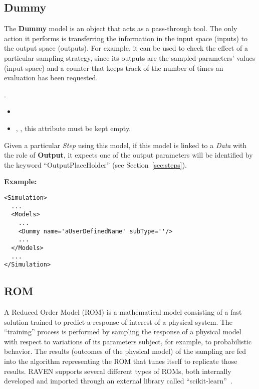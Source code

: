 \subsection{Dummy}
\label{subsec:models_dummy}
The \textbf{Dummy} model is an object that acts as a pass-through tool.
%
The only action it performs is transferring the information in the input
space (inputs) to the output space (outputs).
%
For example, it can be used to check the effect of a particular sampling
strategy, since its outputs are the sampled parameters' values (input space) and
a counter that keeps track of the number of times an evaluation has been
requested.
%

.
%
\attrsIntro
%
\vspace{-5mm}
\begin{itemize}
  \itemsep0em
  \item \nameDescription
  \item {}, , this attribute
  must be kept empty.
\end{itemize}
\vspace{-5mm}
Given a particular \textit{Step} using this model, if this model is linked to
a \textit{Data} with the role of \textbf{Output}, it expects one of the output
parameters will be identified by the keyword ``OutputPlaceHolder'' (see 
Section~\ref{sec:steps}).

\textbf{Example:}
\begin{lstlisting}[style=XML,morekeywords={subType}]
<Simulation>
  ...
  <Models>
    ...
    <Dummy name='aUserDefinedName' subType=''/>
    ...
  </Models>
  ...
</Simulation>
\end{lstlisting}
\subsection{ROM}
\label{subsec:models_ROM}
A Reduced Order Model (ROM) is a mathematical model consisting of a fast
solution trained to predict a response of interest of a physical system.
%
The ``training'' process is performed by sampling the response of a physical
model with respect to variations of its parameters subject, for example, to
probabilistic behavior.
%
The results (outcomes of the physical model) of the sampling are fed into the
algorithm representing the ROM that tunes itself to replicate those results.
%
RAVEN supports several different types of ROMs, both internally developed and
imported through an external library called ``scikit-learn''~\cite{SciKitLearn}.

